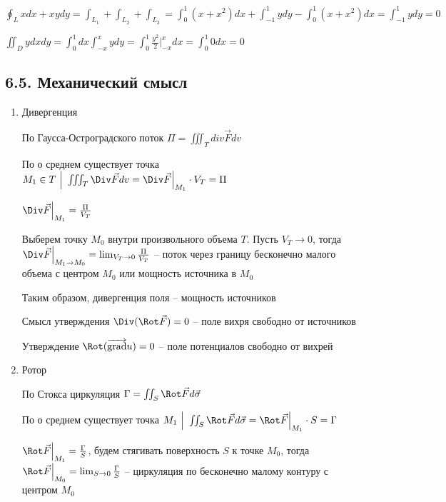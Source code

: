 \documentclass[12pt]{article}
\begin{document}
    $\oint_L xdx + xydy = \int_{L_1} + \int_{L_2} + \int_{L_3} = \int_0^1 (x + x^2) dx + \int_{-1}^1 y dy - \int_0^1 (x + x^2) dx = \int_{-1}^1 y dy = 0$

    $\iint_D y dxdy = \int_0^1 dx \int_{-x}^{x} y dy = \int_0^1 \frac{y^2}{2} \Big|_{-x}^{x} dx = \int_0^1 0 dx = 0$

    \subsection{6.5. Механический смысл}

    \hypertarget{divergencemechanicalmeaning}{}

    \begin{enumerate}[label*=\arabic** ]
        \item Дивергенция

        По \Ths Гаусса-Остроградского поток $\Pi = \iiint_T div \vec{F} dv$

        По \Ths о среднем существует точка $M_1 \in T \ \Big| \ \iiint_T \Div \vec{F} dv = \Div \vec{F} \Big|_{M_1} \cdot V_T = \Pi$

        $\Div \vec{F} \Big|_{M_1} = \frac{\Pi}{V_T}$

        Выберем точку $M_0$ внутри произвольного объема $T$. 
        Пусть $V_T \to 0$, тогда $\Div \vec{F} \Big|_{M_1 \to M_0} = \lim_{V_T \to 0} \frac{\Pi}{V_T}$ -- поток через границу бесконечно малого объема с центром $M_0$ или мощность источника в $M_0$

        Таким образом, дивергенция поля -- мощность источников

        \Notas Смысл утверждения $\Div (\Rot \vec F) = 0$ -- поле вихря свободно от источников

        \Notas Утверждение $\Rot (\overrightarrow{\operatorname{grad}} u) = 0$ -- поле потенциалов свободно от вихрей

        \mediumvspace

        \hypertarget{rotormechanicalmeaning}{}

        \item Ротор

        По \Ths Стокса циркуляция $\Gamma = \iint_S \Rot \vec{F} d\vec{\sigma}$

        По \Ths о среднем существует точка $M_1 \ \Big| \ \iint_S \Rot \vec{F} d\vec{\sigma} = \Rot \vec{F} \Big|_{M_1} \cdot S = \Gamma$

        $\Rot \vec{F} \Big|_{M_1} = \frac{\Gamma}{S}$, будем стягивать поверхность $S$ к точке $M_0$, тогда $\Rot \vec{F} \Big|_{M_0} = \lim_{S \to 0} \frac{\Gamma}{S}$ -- циркуляция по бесконечно малому контуру с центром $M_0$
    \end{enumerate}
\end{document}
